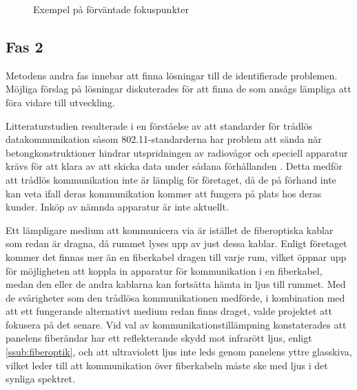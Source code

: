         \begin{figure}[b]
        \centering
            \begin{subfigure}{0.2\textwidth}
            \end{subfigure}
            \begin{subfigure}{0.2\textwidth}
            \end{subfigure}
        \caption{\label{fig:array} Exempel på förväntade fokuspunkter}
        \end{figure}

    \newpage

    \subsection{Fas 2} %
    \label{sub:steg_2}
        Metodens andra fas innebar att finna lösningar till de identifierade problemen. Möjliga förslag på lösningar diskuterades för att finna de som ansågs lämpliga att föra vidare till utveckling.\bigskip

        Litteraturstudien resulterade i en förståelse av att standarder för trådlös datakommunikation såsom 802.11-standarderna har problem att sända när betongkonstruktioner hindrar utspridningen av radiovågor och speciell apparatur krävs för att klara av att skicka data under sådana förhållanden \cite{11n}. Detta medför att trådlös kommunikation inte är lämplig för företaget, då de på förhand inte kan veta ifall deras kommunikation kommer att fungera på plats hos deras kunder. Inköp av nämnda apparatur är inte aktuellt. \bigskip

        Ett lämpligare medium att kommunicera via är istället de fiberoptiska kablar som redan är dragna, då rummet lyses upp av just dessa kablar. Enligt företaget kommer det finnas mer än en fiberkabel dragen till varje rum, vilket öppnar upp för möjligheten att koppla in apparatur för kommunikation i en fiberkabel, medan den eller de andra kablarna kan fortsätta hämta in ljus till rummet. Med de svårigheter som den trådlösa kommunikationen medförde, i kombination med att ett fungerande alternativt medium redan finns draget, valde projektet att fokusera på det senare. Vid val av kommunikationstillämpning konstaterades att panelens fiberändar har ett reflekterande skydd mot infrarött ljus, enligt \ref{ssub:fiberoptik}, och att ultraviolett ljus inte leds genom panelens yttre glasskiva, vilket leder till att kommunikation över fiberkabeln måste ske med ljus i det synliga spektret. \bigskip

